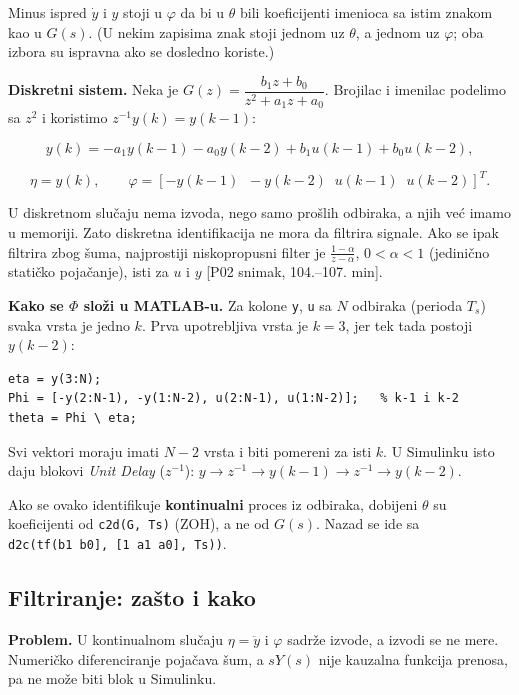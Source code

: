 \documentclass[11pt,a4paper,parskip=half,headsepline,numbers=noenddot]{scrartcl}
\DeclareRobustCommand{\izvor}[1]{{\small\color{izvorC}[#1]}}
\begin{document}
Minus ispred \(\dot y\) i \(y\) stoji u \(\varphi\) da bi u \(\theta\) bili koeficijenti imenioca sa istim znakom kao u \(G(s)\). (U nekim zapisima znak stoji jednom uz \(\theta\), a jednom uz \(\varphi\); oba izbora su ispravna ako se dosledno koriste.)

\textbf{Diskretni sistem.} Neka je \(G(z) = \dfrac{b_1 z + b_0}{z^2 + a_1 z + a_0}\). Brojilac i imenilac podelimo sa \(z^2\) i koristimo \(z^{-1}y(k) = y(k-1)\):

\[y(k) = -a_1 y(k-1) - a_0 y(k-2) + b_1 u(k-1) + b_0 u(k-2),\]

\[\eta = y(k),\qquad \varphi = [-y(k-1)\;\; -y(k-2)\;\; u(k-1)\;\; u(k-2)]^T .\]

U diskretnom slučaju nema izvoda, nego samo prošlih odbiraka, a njih već imamo u memoriji. Zato diskretna identifikacija ne mora da filtrira signale. Ako se ipak filtrira zbog šuma, najprostiji niskopropusni filter je \(\frac{1-\alpha}{z-\alpha}\), \(0 < \alpha < 1\) (jedinično statičko pojačanje), isti za \(u\) i \(y\) \izvor{P02 snimak, 104.--107. min}.

\textbf{Kako se \(\Phi\) složi u MATLAB-u.} Za kolone \texttt{y}, \texttt{u} sa \(N\) odbiraka (perioda \(T_s\)) svaka vrsta je jedno \(k\). Prva upotrebljiva vrsta je \(k = 3\), jer tek tada postoji \(y(k-2)\):

\begin{verbatim}
eta = y(3:N);
Phi = [-y(2:N-1), -y(1:N-2), u(2:N-1), u(1:N-2)];   % k-1 i k-2
theta = Phi \ eta;
\end{verbatim}

Svi vektori moraju imati \(N-2\) vrsta i biti pomereni za isti \(k\). U Simulinku isto daju blokovi \emph{Unit Delay} (\(z^{-1}\)): \(y \to z^{-1} \to y(k-1) \to z^{-1} \to y(k-2)\).

Ako se ovako identifikuje \textbf{kontinualni} proces iz odbiraka, dobijeni \(\theta\) su koeficijenti od \texttt{c2d(\allowbreak{}G,\allowbreak{}\ Ts)} (ZOH), a ne od \(G(s)\). Nazad se ide sa \texttt{d2c(\allowbreak{}tf(\allowbreak{}{[}b1\ b0{]},\allowbreak{}\ {[}1\ a1\ a0{]},\allowbreak{}\ Ts))}.

\subsection{Filtriranje: zašto i kako}

\textbf{Problem.} U kontinualnom slučaju \(\eta = \ddot y\) i \(\varphi\) sadrže izvode, a izvodi se ne mere. Numeričko diferenciranje pojačava šum, a \(sY(s)\) nije kauzalna funkcija prenosa, pa ne može biti blok u Simulinku.
\end{document}

